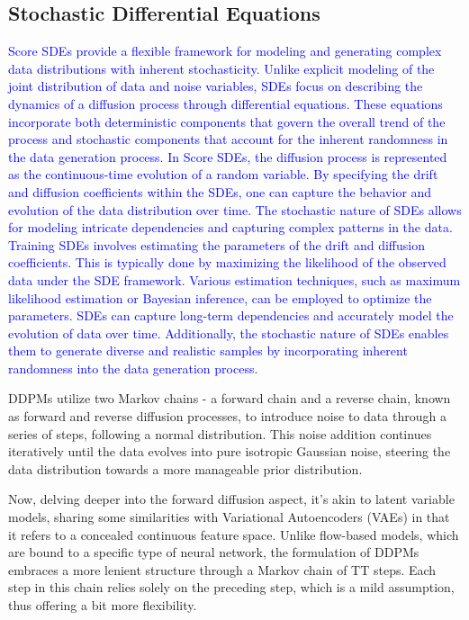 \subsection{Stochastic Differential Equations}
\textcolor{blue}{Score SDEs provide a flexible framework for modeling and generating complex data distributions with inherent stochasticity. Unlike explicit modeling of the joint distribution of data and noise variables, SDEs focus on describing the dynamics of a diffusion process through differential equations. These equations incorporate both deterministic components that govern the overall trend of the process and stochastic components that account for the inherent randomness in the data generation process.
In Score SDEs, the diffusion process is represented as the continuous-time evolution of a random variable. By specifying the drift and diffusion coefficients within the SDEs, one can capture the behavior and evolution of the data distribution over time. The stochastic nature of SDEs allows for modeling intricate dependencies and capturing complex patterns in the data.
Training SDEs involves estimating the parameters of the drift and diffusion coefficients. This is typically done by maximizing the likelihood of the observed data under the SDE framework. Various estimation techniques, such as maximum likelihood estimation or Bayesian inference, can be employed to optimize the parameters.
SDEs can capture long-term dependencies and accurately model the evolution of data over time. Additionally, the stochastic nature of SDEs enables them to generate diverse and realistic samples by incorporating inherent randomness into the data generation process.}








DDPMs utilize two Markov chains - a forward chain and a reverse chain, known as forward and reverse diffusion processes, to introduce noise to data through a series of steps, following a normal distribution. This noise addition continues iteratively until the data evolves into pure isotropic Gaussian noise, steering the data distribution towards a more manageable prior distribution.

Now, delving deeper into the forward diffusion aspect, it's akin to latent variable models, sharing some similarities with Variational Autoencoders (VAEs) in that it refers to a concealed continuous feature space. Unlike flow-based models, which are bound to a specific type of neural network, the formulation of DDPMs embraces a more lenient structure through a Markov chain of TT steps. Each step in this chain relies solely on the preceding step, which is a mild assumption, thus offering a bit more flexibility.

